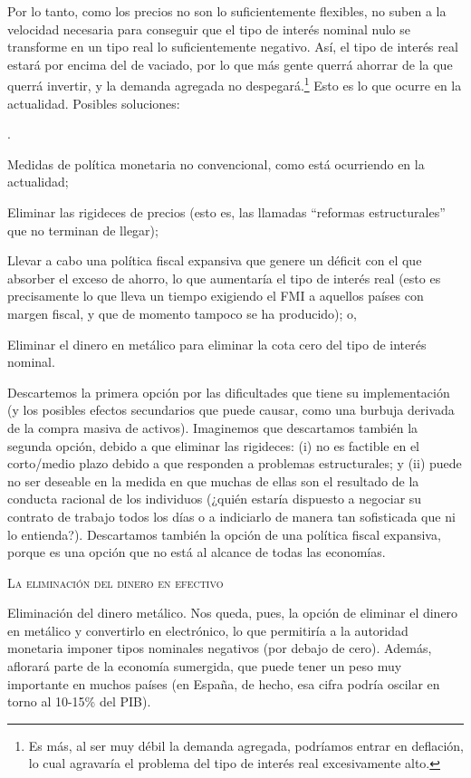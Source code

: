 \documentclass[10pt,a4paper]{article}
\newcounter{numitem}
\newenvironment{lnum}
      {\begin{list}{\arabic{numitem}.}{%
          \usecounter{numitem}%
          \setlength{\leftmargin}{1cm}%
          \setlength{\parskip}{3pt}%
          \setlength{\itemsep}{0pt}%
          \setlength{\parsep}{0pt}%
      }}
      {\end{list}}
\begin{document}
Por lo tanto, como los precios no son lo suficientemente flexibles, no suben a la velocidad necesaria para conseguir que el tipo de interés nominal nulo se transforme en un tipo real lo suficientemente negativo. Así, el tipo de interés real estará por encima del de vaciado, por lo que más gente querrá ahorrar de la que querrá invertir, y la demanda agregada no despegará.\footnote{%
    Es más, al ser muy débil la demanda agregada, podríamos entrar en deflación, lo cual agravaría el problema del tipo de interés real excesivamente alto.
} Esto es lo que ocurre en la actualidad. Posibles soluciones:
\begin{lnum}
    \item Medidas de política monetaria no convencional, como está ocurriendo en la actualidad;
    \item Eliminar las rigideces de precios (esto es, las llamadas “reformas estructurales” que no terminan de llegar);
    \item Llevar a cabo una política fiscal expansiva que genere un déficit con el que absorber el exceso de ahorro, lo que aumentaría el tipo de interés real (esto es precisamente lo que lleva un tiempo exigiendo el FMI a aquellos países con margen fiscal, y que de momento tampoco se ha producido); o,
    \item Eliminar el dinero en metálico para eliminar la cota cero del tipo de interés nominal.
\end{lnum} 

Descartemos la primera opción por las dificultades que tiene su implementación (y los posibles efectos secundarios que puede causar, como una burbuja derivada de la compra masiva de activos). Imaginemos que descartamos también la segunda opción, debido a que eliminar las rigideces: (i) no es factible en el corto/medio plazo debido a que responden a problemas estructurales; y (ii) puede no ser deseable en la medida en que muchas de ellas son el resultado de la conducta racional de los individuos (¿quién estaría dispuesto a negociar su contrato de trabajo todos los días o a indiciarlo de manera tan sofisticada que ni lo entienda?). Descartamos también la opción de una política fiscal expansiva, porque es una opción que no está al alcance de todas las economías.

\textsc{La eliminación del dinero en efectivo}

Eliminación del dinero metálico. Nos queda, pues, la opción de eliminar el dinero en metálico y convertirlo en electrónico, lo que permitiría a la autoridad monetaria imponer tipos nominales negativos (por debajo de cero). Además, aflorará parte de la economía sumergida, que puede tener un peso muy importante en muchos países (en España, de hecho, esa cifra podría oscilar en torno al 10-15\% del PIB).
\end{document}
